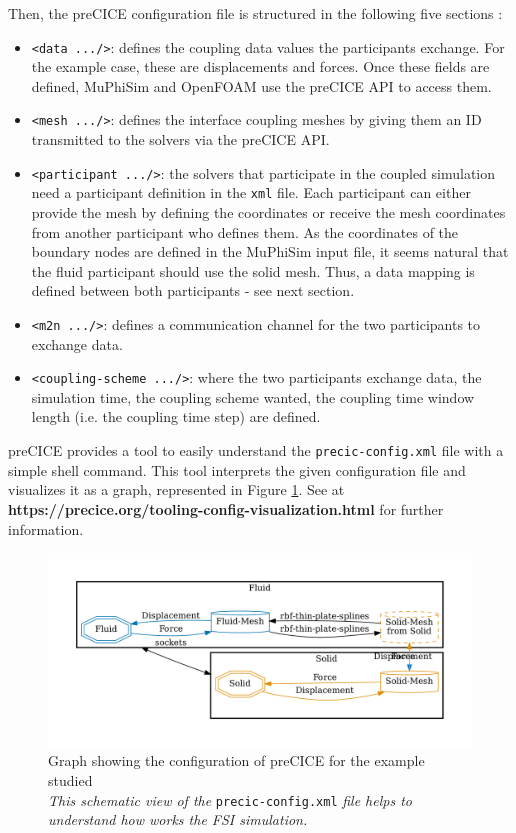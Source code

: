 \documentclass[oneside,11pt,times]{book}
\begin{document}
Then, the preCICE configuration file is structured in the following five sections :
\begin{itemize}
    \item \texttt{<data .../>}: defines the coupling data values the participants exchange. For the example case, these are displacements and forces. Once these fields are defined, MuPhiSim and OpenFOAM use the preCICE API to access them.
    \item \texttt{<mesh .../>}: defines the interface coupling meshes by giving them an ID transmitted to the solvers via the preCICE API.
    \item \texttt{<participant .../>}: the solvers that participate in the coupled simulation need a participant definition in the \texttt{xml} file. Each participant can either provide the mesh by defining the coordinates or receive the mesh coordinates from another participant who defines them. As the coordinates of the boundary nodes are defined in the MuPhiSim input file, it seems natural that the fluid participant should use the solid mesh. Thus, a data mapping is defined between both participants - see next section.
    \item \texttt{<m2n .../>}: defines a communication channel for the two participants to exchange data.
    \item \texttt{<coupling-scheme .../>}: where the two participants exchange data, the simulation time, the coupling scheme wanted, the coupling time window length (i.e. the coupling time step) are defined.
\end{itemize}

preCICE provides a tool to easily understand the \texttt{precic-config.xml} file with a simple shell command. This tool interprets the given configuration file and visualizes it as a graph, represented in Figure \ref{graph}. See at \textbf{https://precice.org/tooling-config-visualization.html} for further information.

\begin{figure}[h]
    \centering
    \includegraphics[width=14cm]{imgs/Illustrations/graph.pdf}
    \caption{Graph showing the configuration of preCICE for the example studied\\ \emph{This schematic view of the} \texttt{precic-config.xml} \emph{file helps to understand how works the FSI simulation.}}
    \label{graph}
\end{figure}
\end{document}

